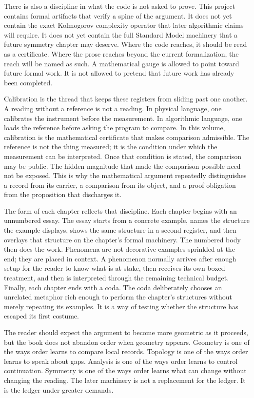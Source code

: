There is also a discipline in what the code is not asked to prove. This project
contains formal artifacts that verify a spine of the argument. It does not yet
contain the exact Kolmogorov complexity operator that later algorithmic claims
will require. It does not yet contain the full Standard Model machinery that a
future symmetry chapter may deserve. Where the code reaches, it should be read
as a certificate. Where the prose reaches beyond the current formalization, the
reach will be named as such. A mathematical gauge is allowed to point toward
future formal work. It is not allowed to pretend that future work has already
been completed.

Calibration is the thread that keeps these registers from sliding past one
another. A reading without a reference is not a reading. In physical language,
one calibrates the instrument before the measurement. In algorithmic language,
one loads the reference before asking the program to compare. In this volume,
calibration is the mathematical certificate that makes comparison admissible.
The reference is not the thing measured; it is the condition under which the
measurement can be interpreted. Once that condition is stated, the comparison
may be public. The hidden magnitude that made the comparison possible need not
be exposed. This is why the mathematical argument repeatedly distinguishes a
record from its carrier, a comparison from its object, and a proof obligation
from the proposition that discharges it.

The form of each chapter reflects that discipline. Each chapter begins with an
unnumbered essay. The essay starts from a concrete example, names the structure
the example displays, shows the same structure in a second register, and then
overlays that structure on the chapter's formal machinery. The numbered body
then does the work. Phenomena are not decorative examples sprinkled at the end;
they are placed in context. A phenomenon normally arrives after enough setup for
the reader to know what is at stake, then receives its own boxed treatment, and
then is interpreted through the remaining technical budget. Finally, each
chapter ends with a coda. The coda deliberately chooses an unrelated metaphor
rich enough to perform the chapter's structures without merely repeating its
examples. It is a way of testing whether the structure has escaped its first
costume.

The reader should expect the argument to become more geometric as it proceeds,
but the book does not abandon order when geometry appears. Geometry is one of
the ways order learns to compare local records. Topology is one of the ways
order learns to speak about gaps. Analysis is one of the ways order learns to
control continuation. Symmetry is one of the ways order learns what can change
without changing the reading. The later machinery is not a replacement for the
ledger. It is the ledger under greater demands.

